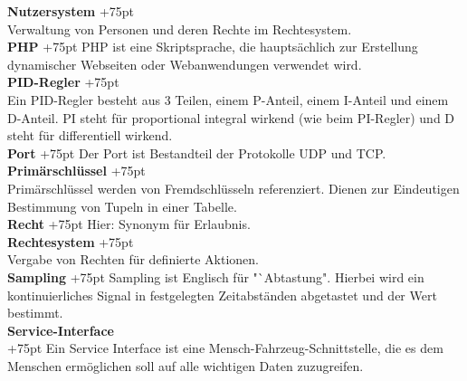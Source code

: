 \documentclass[fontsize = 12pt, paper = a4]{scrreprt}
\begin{document}
\begin{spacing}{0.95}
\textbf{Nutzersystem}
\hangindent+75pt  \\
Verwaltung von Personen und deren Rechte im Rechtesystem.\\


\textbf{PHP}
\hangindent+75pt 
\hspace*{13.5mm}
PHP ist eine Skriptsprache, die hauptsächlich zur Erstellung dynamischer Webseiten oder Webanwendungen verwendet wird.\\

\textbf{PID-Regler}
\hangindent+75pt  \\
Ein PID-Regler besteht aus 3 Teilen, einem P-Anteil, einem I-Anteil und einem D-Anteil. PI steht für proportional integral wirkend (wie beim PI-Regler) und D steht für differentiell wirkend.\\

\textbf{Port}
\hangindent+75pt 
\hspace*{14.2mm}
Der Port ist Bestandteil der Protokolle UDP und TCP.\\

\textbf{Primärschlüssel}
\hangindent+75pt  \\
Primärschlüssel werden von Fremdschlüsseln referenziert. Dienen zur Eindeutigen Bestimmung von Tupeln in einer Tabelle.\\

\textbf{Recht}
\hangindent+75pt  
\hspace*{11.5mm} Hier: Synonym für Erlaubnis.\\

\textbf{Rechtesystem}
\hangindent+75pt  \\
Vergabe von Rechten für definierte Aktionen.\\

\textbf{Sampling}
\hangindent+75pt  
\hspace*{4.5mm}
Sampling ist Englisch für "`Abtastung". Hierbei wird ein kontinuierliches Signal in festgelegten Zeitabständen abgetastet und der Wert bestimmt.\\

\textbf{Service-Interface} \\
\hangindent+75pt  
Ein Service Interface ist eine Mensch-Fahrzeug-Schnittstelle, die es dem Menschen ermöglichen soll auf alle wichtigen Daten zuzugreifen.\\


\end{spacing}
\end{document}
